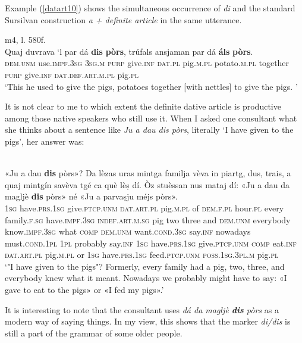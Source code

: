 Example (\ref{datart10}) shows the simultaneous occurrence of \textit{di} and the standard Sursilvan construction \textit{a + definite article} in the same utterance.

\ea\label{datart10}
 {m4, l. 580f.}\\
\gll   Quaj duvrava `l par dá \textbf{dis} \textbf{pòrs}, trúfals ansjaman par dá \textbf{áls} \textbf{pòrs}. \\
\textsc{dem.unm} use.\textsc{impf.3sg} \textsc{3sg.m} \textsc{purp} give.\textsc{inf} \textsc{dat.pl} pig.\textsc{m.pl} potato.\textsc{m.pl} together \textsc{purp} give.\textsc{inf}  \textsc{dat.def.art.m.pl} pig.\textsc{pl} \\
\glt `This he used to give the pigs, potatoes together [with nettles] to give the pigs. '
\z
 
It is not clear to me to which extent the definite dative article is productive among those native speakers who still use it. When I asked one consultant what she thinks about a sentence like \textit{Ju a dau dis pòrs}, literally `I have given to the pigs', her answer was:

\ea\label{datart11}
\\
\gll «Ju a dau \textbf{dis} pòrs»? Da lèzas uras mintga familja vèva in piartg, dus, trais, a quaj mintgín savèva tgé ca què lèṣ dí. Òz stuèssan nus mataj dí: «Ju a dau da magljè \textbf{dis} pòrs» né «Ju a parvaṣju méjs pòrs». \\
\textsc{1sg} have.\textsc{prs.1sg} give.\textsc{ptcp.unm} \textsc{dat.art.pl} pig.\textsc{m.pl} of \textsc{dem.f.pl} hour.\textsc{pl} every family.\textsc{f.sg} have.\textsc{impf.3sg} \textsc{indef.art.m.sg} pig two three and  \textsc{dem.unm} everybody know.\textsc{impf.3sg} what \textsc{comp}  \textsc{dem.unm} want.\textsc{cond.3sg} say.\textsc{inf} nowadays must.\textsc{cond.1pl} \textsc{1pl} probably  say.\textsc{inf} \textsc{1sg} have.\textsc{prs.1sg} give.\textsc{ptcp.unm}  \textsc{comp} eat.\textsc{inf} \textsc{dat.art.pl} pig.\textsc{m.pl} or  \textsc{1sg} have.\textsc{prs.1sg} feed.\textsc{ptcp.unm} \textsc{poss.1sg.3pl.m} pig.\textsc{pl}\\
\glt `"I have given to the pigs"? Formerly, every family had a pig, two, three, and everybody knew what it meant. Nowadays we probably might have to say: «I gave to eat to the pigs» or «I fed my pigs».'
\z

It is interesting to note that the consultant uses \textit{dá da magljè \textbf{dis} pòrs} as a modern way of saying things. In my view, this shows that the marker \textit{di/dis} is still a part of the grammar of some older people.

